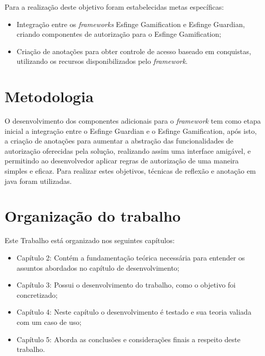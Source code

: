 \par Para a realização deste objetivo foram estabelecidas metas específicas:
\begin{itemize}
    \item Integração entre os \textit{frameworks} Esfinge Gamification e Esfinge Guardian, criando componentes de autorização para o Esfinge Gamification;
    \item Criação de anotações para obter controle de acesso baseado em conquistas, utilizando os recursos disponibilizados pelo \textit{framework}.
\end{itemize}

\section{Metodologia}

\par O desenvolvimento dos componentes adicionais para o \textit{framework} tem como etapa inicial a integração entre o Esfinge Guardian e o Esfinge Gamification, após isto, a criação de anotações para aumentar a abstração das funcionalidades de autorização oferecidas pela solução, realizando assim uma interface amigável, e permitindo ao desenvolvedor aplicar regras de autorização de uma maneira simples e eficaz. Para realizar estes objetivos, técnicas de reflexão e anotação em java foram utilizadas.

\section{Organização do trabalho}

Este Trabalho está organizado nos seguintes capítulos:

\begin{itemize}
	\item Capítulo 2: Contém a fundamentação teórica necessária para entender os assuntos abordados no capítulo de desenvolvimento;
	\item Capítulo 3: Possui o desenvolvimento do trabalho, como o objetivo foi concretizado;
	\item Capítulo 4: Neste capítulo o desenvolvimento é testado e sua teoria valiada com um caso de uso;
	\item Capítulo 5: Aborda as conclusões e considerações finais a respeito deste trabalho.
\end{itemize}